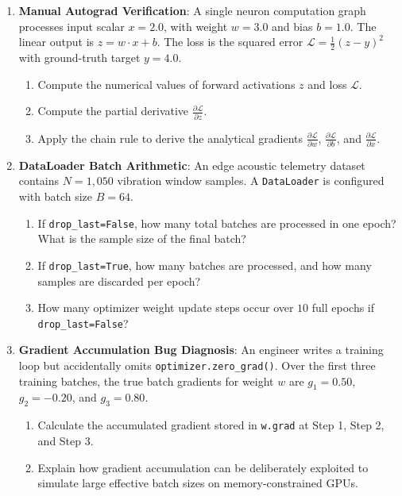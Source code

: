 \begin{checkyourself}
\begin{enumerate}
    \item \textbf{Manual Autograd Verification}:
    A single neuron computation graph processes input scalar $x = 2.0$, with weight $w = 3.0$ and bias $b = 1.0$. The linear output is $z = w \cdot x + b$. The loss is the squared error $\mathcal{L} = \frac{1}{2}(z - y)^2$ with ground-truth target $y = 4.0$.
    \begin{enumerate}[label=(\alph*)]
        \item Compute the numerical values of forward activations $z$ and loss $\mathcal{L}$.
        \item Compute the partial derivative $\frac{\partial \mathcal{L}}{\partial z}$.
        \item Apply the chain rule to derive the analytical gradients $\frac{\partial \mathcal{L}}{\partial w}$, $\frac{\partial \mathcal{L}}{\partial b}$, and $\frac{\partial \mathcal{L}}{\partial x}$.
    \end{enumerate}

    \item \textbf{DataLoader Batch Arithmetic}:
    An edge acoustic telemetry dataset contains $N = 1{,}050$ vibration window samples. A \texttt{DataLoader} is configured with batch size $B = 64$.
    \begin{enumerate}[label=(\alph*)]
        \item If \texttt{drop\_last=False}, how many total batches are processed in one epoch? What is the sample size of the final batch?
        \item If \texttt{drop\_last=True}, how many batches are processed, and how many samples are discarded per epoch?
        \item How many optimizer weight update steps occur over $10$ full epochs if \texttt{drop\_last=False}?
    \end{enumerate}

    \item \textbf{Gradient Accumulation Bug Diagnosis}:
    An engineer writes a training loop but accidentally omits \texttt{optimizer.zero\_grad()}. Over the first three training batches, the true batch gradients for weight $w$ are $g_1 = 0.50$, $g_2 = -0.20$, and $g_3 = 0.80$.
    \begin{enumerate}[label=(\alph*)]
        \item Calculate the accumulated gradient stored in \texttt{w.grad} at Step 1, Step 2, and Step 3.
        \item Explain how gradient accumulation can be deliberately exploited to simulate large effective batch sizes on memory-constrained GPUs.
    \end{enumerate}


\end{enumerate}
\end{checkyourself}
